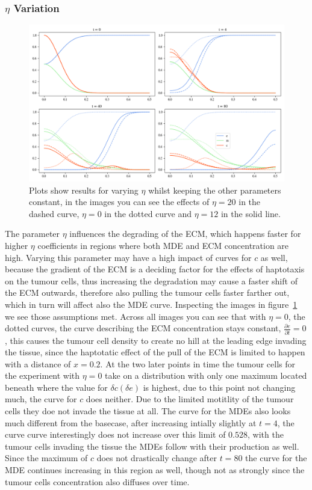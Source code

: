\subsubsection*{$\eta$ Variation}
\begin{figure}[h]
    \centering
    \includegraphics[width=\textwidth]{resources/images/eta_variation.png}
    \caption{Plots show results for varying $\eta$ whilst keeping the other parameters constant, in the images you can see the effects of $\eta=20$ in the dashed curve, $\eta=0$ in the dotted curve and $\eta=12$ in the solid line.}
    \label{fig:eta_variation}
\end{figure}
The parameter $\eta$ influences the degrading of the ECM, which happens faster for higher $\eta$ coefficients in regions where both MDE and ECM concentration are high. Varying this parameter may have a high impact of curves for $c$ as well, because the gradient of the ECM is a deciding factor for the effects of haptotaxis on the tumour cells, thus increasing the degradation may cause a faster shift of the ECM outwards, therefore also pulling the tumour cells faster farther out, which in turn will affect also the MDE curve.\newline
Inspecting the images in figure~\ref{fig:eta_variation} we see those assumptions met. Across all images you can see that with $\eta=0$, the dotted curves, the curve describing the ECM concentration stays constant, $\frac{\partial e}{\partial t} = 0$, this causes the tumour cell density to create no hill at the leading edge invading the tissue, since the haptotatic effect of the pull of the ECM is limited to happen with a distance of $x=0.2$. At the two later points in time the tumour cells for the experiment with $\eta=0$ take on a distribution with only one maximum located beneath where the value for $\delta c (\delta e)$ is highest, due to this point not changing much, the curve for $c$ does neither. Due to the limited motitlity of the tumour cells they doe not invade the tissue at all. The curve for the MDEs also looks much different from the basecase, after increasing intially slightly at $t=4$, the curve curve interestingly does not increase over this limit of $0.528$, with the tumour cells invading the tissue the MDEs follow with their production as well. Since the maximum of $c$ does not drastically change after $t=80$ the curve for the MDE continues increasing in this region as well, though not as strongly since the tumour cells concentration also diffuses over time. 
